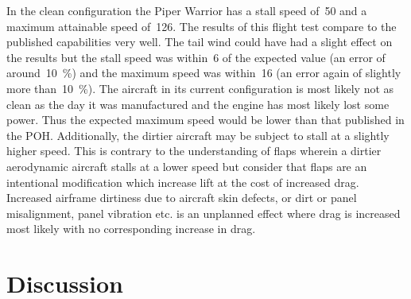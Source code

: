 \documentclass[conf]{new-aiaa}
\begin{document}
In the clean configuration the Piper Warrior has a stall speed of~\SI{50}{\kts} and a maximum attainable speed of~\SI{126}{\kts}. The results of this flight test compare to the published capabilities very well. The tail wind could have had a slight effect on the results but the stall speed was within~\SI{6}{\kts} of the expected value (an error of around~\SI{10}{\percent}) and the maximum speed was within~\SI{16}{\kts} (an error again of slightly more than~\SI{10}{\percent}). The aircraft in its current configuration is most likely not as clean as the day it was manufactured and the engine has most likely lost some power. Thus the expected maximum speed would be lower than that published in the POH. Additionally, the dirtier aircraft may be subject to stall at a slightly higher speed. This is contrary to the understanding of flaps wherein a dirtier aerodynamic aircraft stalls at a lower speed but consider that flaps are an intentional modification which increase lift at the cost of increased drag. Increased airframe dirtiness due to aircraft skin defects, or dirt or panel misalignment, panel vibration etc. is an unplanned effect where drag is increased most likely with no corresponding increase in drag.

\FloatBarrier

\section{Discussion}
\end{document}

